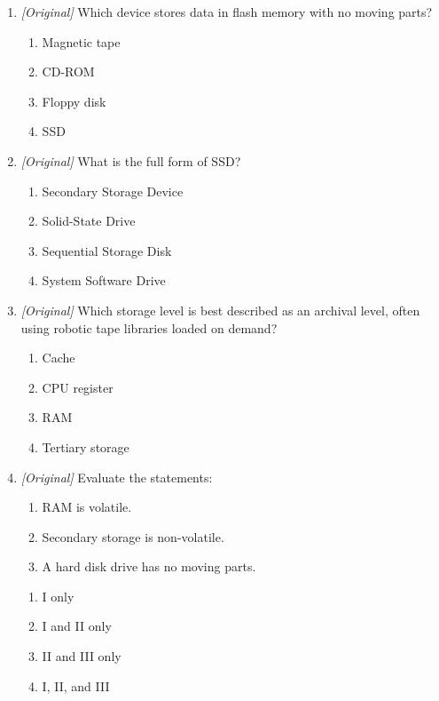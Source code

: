 \documentclass[11pt]{article}
\begin{document}
\begin{enumerate}[label=\textbf{Q\arabic*.}, leftmargin=*]
\begin{enumerate}[label=\Alph*.]
    \item A hard disk uses flash memory to store data.
    \item An SSD has no moving parts.
  \end{enumerate}
\item \textit{[Original]} Which device stores data in flash memory with no
  moving parts?
  \begin{enumerate}[label=\Alph*.]
    \item Magnetic tape
    \item CD-ROM
    \item Floppy disk
    \item SSD
  \end{enumerate}
\item \textit{[Original]} What is the full form of SSD?
  \begin{enumerate}[label=\Alph*.]
    \item Secondary Storage Device
    \item Solid-State Drive
    \item Sequential Storage Disk
    \item System Software Drive
  \end{enumerate}
\item \textit{[Original]} Which storage level is best described as an
  archival level, often using robotic tape libraries loaded on demand?
  \begin{enumerate}[label=\Alph*.]
    \item Cache
    \item CPU register
    \item RAM
    \item Tertiary storage
  \end{enumerate}
\item \textit{[Original]} Evaluate the statements:
  \begin{enumerate}[label=\Roman*.]
    \item RAM is volatile.
    \item Secondary storage is non-volatile.
    \item A hard disk drive has no moving parts.
  \end{enumerate}
  \begin{enumerate}[label=\Alph*.]
    \item I only
    \item I and II only
    \item II and III only
    \item I, II, and III
  \end{enumerate}

\end{enumerate}
\end{document}
